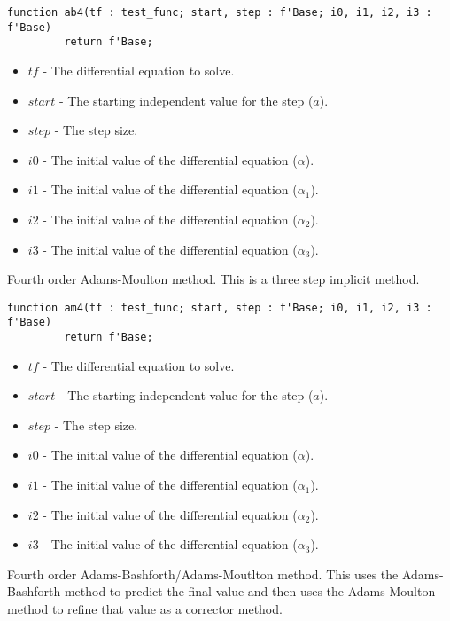 \documentclass[10pt, openany]{book}
\begin{document}
\begin{lstlisting}
function ab4(tf : test_func; start, step : f'Base; i0, i1, i2, i3 : f'Base)
         return f'Base;
\end{lstlisting}
\begin{itemize}
  \item $tf$ - The differential equation to solve.
  \item $start$ - The starting independent value for the step ($a$).
  \item $step$ - The step size.
  \item $i0$ - The initial value of the differential equation ($\alpha$).
  \item $i1$ - The initial value of the differential equation ($\alpha_1$).
  \item $i2$ - The initial value of the differential equation ($\alpha_2$).
  \item $i3$ - The initial value of the differential equation ($\alpha_3$).
\end{itemize}

Fourth order Adams-Moulton method.  This is a three step implicit method.

\begin{lstlisting}
function am4(tf : test_func; start, step : f'Base; i0, i1, i2, i3 : f'Base)
         return f'Base;
\end{lstlisting}
\begin{itemize}
  \item $tf$ - The differential equation to solve.
  \item $start$ - The starting independent value for the step ($a$).
  \item $step$ - The step size.
  \item $i0$ - The initial value of the differential equation ($\alpha$).
  \item $i1$ - The initial value of the differential equation ($\alpha_1$).
  \item $i2$ - The initial value of the differential equation ($\alpha_2$).
  \item $i3$ - The initial value of the differential equation ($\alpha_3$).
\end{itemize}

Fourth order Adams-Bashforth/Adams-Moutlton method.  This uses the Adams-Bashforth method to predict the final value and then uses the Adams-Moulton method to refine that value as a corrector method.
\end{document}
